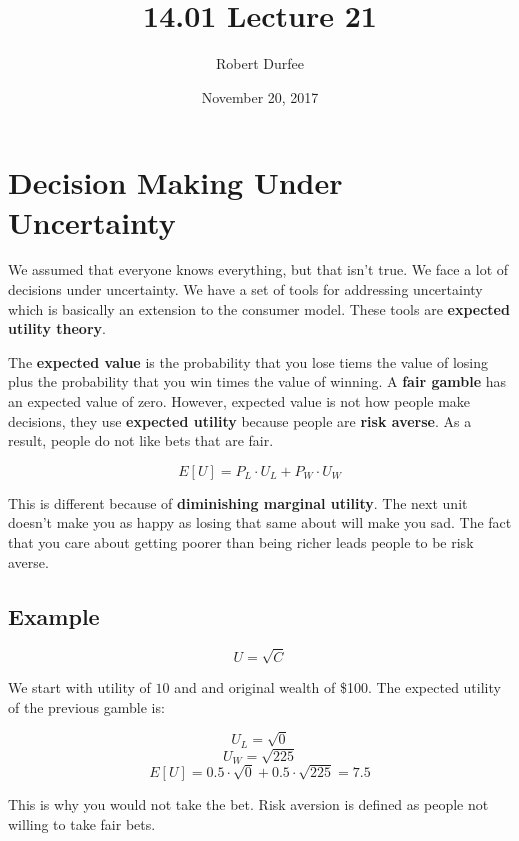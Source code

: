 \documentclass{article}
\title{ 14.01 Lecture 21 }
\author{ Robert Durfee }
\date{ November 20, 2017 }
\begin{document}
\maketitle

\section{ Decision Making Under Uncertainty }

We assumed that everyone knows everything, but that isn't true. We face a lot of
decisions under uncertainty. We have a set of tools for addressing uncertainty
which is basically an extension to the consumer model. These tools are
\textbf{expected utility theory}. 

The \textbf{expected value} is the probability that you lose tiems the value of
losing plus the probability that you win times the value of winning. A
\textbf{fair gamble} has an expected value of zero. However, expected value is
not how people make decisions, they use \textbf{expected utility} because people
are \textbf{risk averse}. As a result, people do not like bets that are fair.

$$E[U] = P_L \cdot U_L + P_W \cdot U_W$$

This is different because of \textbf{diminishing marginal utility}. The next
unit doesn't make you as happy as losing that same about will make you sad. The
fact that you care about getting poorer than being richer leads people to be
risk averse.

\subsection{Example}

$$U = \sqrt{C}$$

We start with utility of $10$ and and original wealth of \$100. The expected
utility of the previous gamble is:

$$U_L = \sqrt{0}$$
$$U_W = \sqrt{225}$$
$$E[U] = 0.5 \cdot  \sqrt{0} + 0.5 \cdot \sqrt{225} = 7.5$$

This is why you would not take the bet. Risk aversion is defined as people not
willing to take fair bets.
\end{document}
